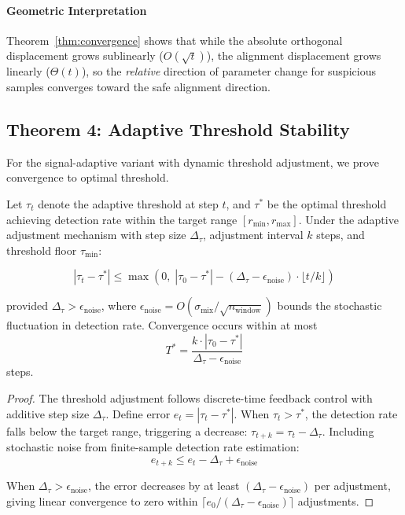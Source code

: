 \paragraph{Geometric Interpretation}
Theorem~\ref{thm:convergence} shows that while the absolute orthogonal displacement grows sublinearly ($O(\sqrt{t})$), the alignment displacement grows linearly ($\Theta(t)$), so the \textit{relative} direction of parameter change for suspicious samples converges toward the safe alignment direction.

\subsection{Theorem 4: Adaptive Threshold Stability}
\label{subsec:theorem4}

For the signal-adaptive variant with dynamic threshold adjustment, we prove convergence to optimal threshold.

\begin{theorem}
\label{thm:adaptive_stability}
Let $\tau_t$ denote the adaptive threshold at step $t$, and $\tau^*$ be the optimal threshold achieving detection rate within the target range $[r_{\min}, r_{\max}]$. Under the adaptive adjustment mechanism with step size $\Delta_\tau$, adjustment interval $k$ steps, and threshold floor $\tau_{\min}$:

\begin{equation}
|\tau_t - \tau^*| \leq \max\left(0,\; |\tau_0 - \tau^*| - (\Delta_\tau - \epsilon_{\text{noise}}) \cdot \lfloor t/k \rfloor\right)
\end{equation}

provided $\Delta_\tau > \epsilon_{\text{noise}}$, where $\epsilon_{\text{noise}} = O(\sigma_{\text{mix}}/\sqrt{n_{\text{window}}})$ bounds the stochastic fluctuation in detection rate. Convergence occurs within at most
\begin{equation}
T^* = \frac{k \cdot |\tau_0 - \tau^*|}{\Delta_\tau - \epsilon_{\text{noise}}}
\end{equation}
steps.
\end{theorem}

\begin{proof}
The threshold adjustment follows discrete-time feedback control with additive step size $\Delta_\tau$. Define error $e_t = |\tau_t - \tau^*|$. When $\tau_t > \tau^*$, the detection rate falls below the target range, triggering a decrease: $\tau_{t+k} = \tau_t - \Delta_\tau$. Including stochastic noise from finite-sample detection rate estimation:
\begin{equation}
e_{t+k} \leq e_t - \Delta_\tau + \epsilon_{\text{noise}}
\end{equation}

When $\Delta_\tau > \epsilon_{\text{noise}}$, the error decreases by at least $(\Delta_\tau - \epsilon_{\text{noise}})$ per adjustment, giving linear convergence to zero within $\lceil e_0 / (\Delta_\tau - \epsilon_{\text{noise}}) \rceil$ adjustments.
\end{proof}

